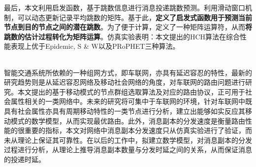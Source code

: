 最后，本文利用启发函数，基于跳数信息进行消息投递跳数预测。利用滑动窗口机制，可以动态更新记录平均跳数的矩阵。基于此，\textbf{定义了启发式函数用于预测当前节点到目的节点之间的潜在跳数}。为了便于计算，定义了一种矩阵运算符，从而\textbf{将跳数的估计过程转化为矩阵运算}。仿真实验表明：本文提出的HCH算法在综合性能表现上优于Epidemic, S \& W以及PRoPHET三种算法。

~\\

智能交通系统所依赖的一种组网方式，即车联网，亦具有延迟容忍的特性，最新的研究趋势则是从延迟容忍网络及移动社会网络的角度，对车联网的路由问题进行研究。本文提出的基于移动模式的节点群组选取算法及对应的路由协议，正可用于社会属性相关的一类网络中。未来的研究将可集中于车联网的环境，针对车联网中既具有社会属性亦具有周期移动特性的一类节点进行分析，建立出能够如实反应其移动模式的数学模型，从而实现最优路由。此外，消息副本的分发速度是衡量路由性能的很重要的指标，本文对网络中消息副本分发速度只从仿真实验进行了验证，而未从理论上保证其可靠性。在以后的工作中，拟建立数学模型，对消息副本的分发过程进行分析，从理论上推导消息副本数量与分发时延之间的关系，从而保证消息的投递时延。

